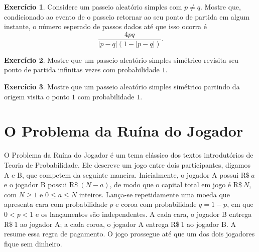 \documentclass[12pt,portuguese]{article}
\theoremstyle{definition}
\theoremstyle{plainexercise}
\newtheorem{exercise}{Exercício}
\theoremstyle{starredexercise}
\theoremstyle{definition}
\begin{document}
\begin{exercise}\label{exercise:tempo-retorno-condicional}
Considere um passeio aleatório simples com $p \neq q$. Mostre que, condicionado
ao evento de o passeio retornar ao seu ponto de partida em algum instante, o
número esperado de passos dados até que isso ocorra é
\[
\frac{4pq}{|p - q|(1 - |p - q|)}.
\]
\end{exercise}

\begin{exercise}\label{exercise:infinitos-retornos}
Mostre que um passeio aleatório simples simétrico revisita seu ponto de partida
infinitas vezes com probabilidade $1$.
\end{exercise}

\begin{exercise}\label{exercise:visita-um}
Mostre que um passeio aleatório simples simétrico partindo da origem visita o
ponto $1$ com probabilidade $1$.
\end{exercise}

\section{O Problema da Ruína do Jogador}\label{sec:ruina-jogador}

O Problema da Ruína do Jogador é um tema clássico dos textos introdutórios de
Teoria de Probabilidade. Ele descreve um jogo entre dois participantes, digamos
A e B, que competem da seguinte maneira. Inicialmente, o jogador A possui
$\mathrm{R\$}~a$ e o jogador B possui $\mathrm{R\$}~(N-a)$, de modo que o
capital total em jogo é $\mathrm{R\$}~N$, com $N \geqslant 1$ e
$0 \leqslant a \leqslant N$ inteiros. Lança-se repetidamente uma moeda que
apresenta cara com probabilidade $p$ e coroa com probabilidade $q = 1 - p$, em
que $0 < p < 1$ e os lançamentos são independentes. A cada cara, o jogador B
entrega $\mathrm{R\$}~1$ ao jogador A; a cada coroa, o jogador A entrega
$\mathrm{R\$}~1$ ao jogador B. A  resume essa
regra de pagamento. O jogo prossegue até que um dos dois jogadores
fique sem dinheiro.

\end{document}

